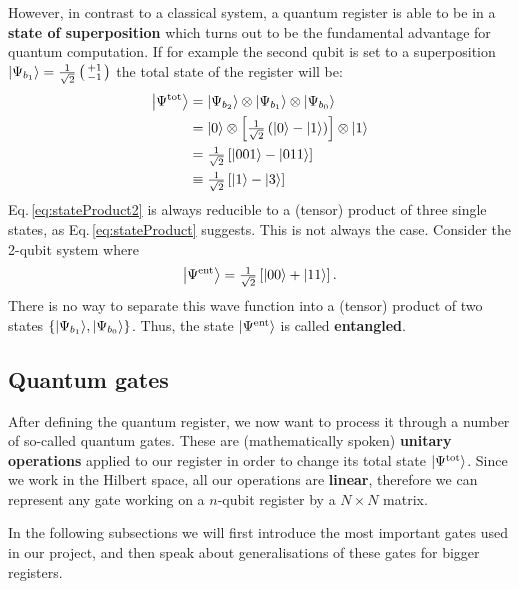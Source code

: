 \documentclass[bibliography=totocnumbered]{article}
\theoremstyle{NoticeStyle}
\begin{document}
However, in contrast to a classical system, a quantum register is able to be in a \textbf{state of superposition} which turns out to be the fundamental advantage for quantum computation. If for example the second qubit is set to a superposition ${\left\vert{\Psi_{b_1}}\right\rangle}=\tfrac{1}{\sqrt{2}}\left(\begin{smallmatrix}
+1\\-1
\end{smallmatrix}\right)$ the total state of the register will be:
%
\begin{align}
	{\left\vert{\Psi^\text{tot}}\right\rangle} &= {\left\vert{\Psi_{b_2}}\right\rangle} \otimes {\left\vert{\Psi_{b_1}}\right\rangle} \otimes {\left\vert{\Psi_{b_0}}\right\rangle}\label{eq:stateProduct}\\
			   &= {\left\vert{0}\right\rangle} \otimes \left[ \tfrac{1}{\sqrt{2}} \left({\left\vert{0}\right\rangle} - {\left\vert{1}\right\rangle}\right) \right] \otimes {\left\vert{1}\right\rangle}\\
			   &= \tfrac{1}{\sqrt{2}} \left[ {\left\vert{001}\right\rangle} - {\left\vert{011}\right\rangle}   \right]\\
			   &\equiv \tfrac{1}{\sqrt{2}} \left[ {\left\vert{1}\right\rangle} - {\left\vert{3}\right\rangle}   \right]\label{eq:stateProduct2}
\end{align} 
%
Eq.\,\ref{eq:stateProduct2} is always reducible to a (tensor) product of three single states, as Eq.\,\ref{eq:stateProduct} suggests. This is not always the case. Consider the 2-qubit system where
%
\begin{align}
	{\left\vert{\Psi^\text{ent}}\right\rangle} = \tfrac{1}{\sqrt{2}}  \left[ {\left\vert{00}\right\rangle} + {\left\vert{11}\right\rangle} \right].
\end{align}
%
There is no way to separate this wave function into a (tensor) product of two states
$\{ {\left\vert{\Psi_{b_1}}\right\rangle}, {\left\vert{\Psi_{b_0}}\right\rangle} \}$. Thus, the state ${\left\vert{\Psi^\text{ent}}\right\rangle}$ is called \textbf{entangled}.

\subsection{Quantum gates}\label{sec:Quantum gates}
After defining the quantum register, we now want to process it through a number of so-called quantum gates. These are (mathematically spoken) \textbf{unitary operations} applied to our register in order to change its total state ${\left\vert{\Psi^\text{tot}}\right\rangle}$. Since we work in the Hilbert space, all our operations are \textbf{linear}, therefore we can represent any gate working on a $n$-qubit register by a $N \times N$ matrix.

In the following subsections we will first introduce the most important gates used in our project, and then speak about generalisations of these gates for bigger registers.
\end{document}
